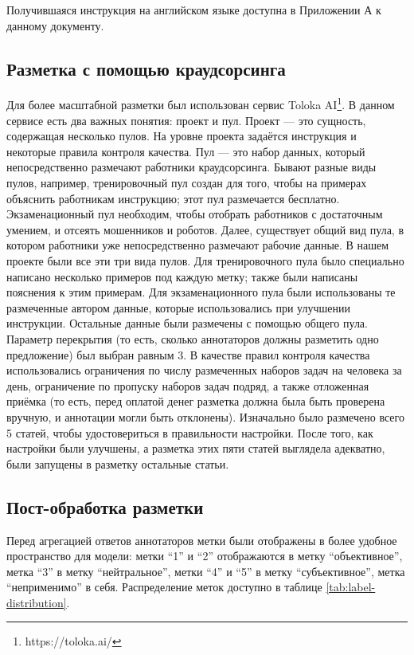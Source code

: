 \documentclass[a4paper,14pt]{extarticle}
\begin{document}
    Получившаяся инструкция на английском языке доступна в Приложении А к данному документу.
    
    \subsection{Разметка с помощью краудсорсинга}
    Для более масштабной разметки был использован сервис Toloka AI\footnote{https://toloka.ai/}. В данном сервисе есть два важных понятия: проект и пул. Проект --- это сущность, содержащая несколько пулов. На уровне проекта задаётся инструкция и некоторые правила контроля качества. Пул --- это набор данных, который непосредственно размечают работники краудсорсинга. Бывают разные виды пулов, например, тренировочный пул создан для того, чтобы на примерах объяснить работникам инструкцию; этот пул размечается бесплатно. Экзаменационный пул необходим, чтобы отобрать работников с достаточным умением, и отсеять мошенников и роботов. Далее, существует общий вид пула, в котором работники уже непосредственно размечают рабочие данные. В нашем проекте были все эти три вида пулов. Для тренировочного пула было специально написано несколько примеров под каждую метку; также были написаны пояснения к этим примерам. Для экзаменационного пула были использованы те размеченные автором данные, которые использовались при улучшении инструкции. Остальные данные были размечены с помощью общего пула. Параметр перекрытия (то есть, сколько аннотаторов должны разметить одно предложение) был выбран равным 3. В качестве правил контроля качества использовались ограничения по числу размеченных наборов задач на человека за день, ограничение по пропуску наборов задач подряд, а также отложенная приёмка (то есть, перед оплатой денег разметка должна была быть проверена вручную, и аннотации могли быть отклонены). Изначально было размечено всего 5 статей, чтобы удостовериться в правильности настройки. После того, как настройки были улучшены, а разметка этих пяти статей выглядела адекватно, были запущены в разметку остальные статьи.
    
    \subsection{Пост-обработка разметки}
    Перед агрегацией ответов аннотаторов метки были отображены в более удобное пространство для модели: метки ``1'' и ``2'' отображаются в метку ``объективное'', метка ``3'' в метку ``нейтральное'', метки ``4'' и ``5'' в метку ``субъективное'', метка ``неприменимо'' в себя. Распределение меток доступно в таблице \ref{tab:label-distribution}.
    
\end{document}
